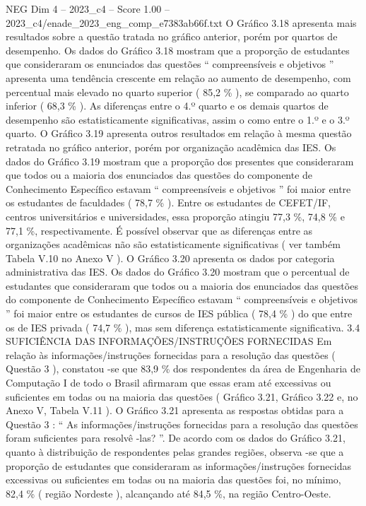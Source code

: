 \begin{textsample}{NEG Dim 4 – 2023\_c4 – Score 1.00 – 2023\_c4/enade\_2023\_eng\_comp\_e7383ab66f.txt}
O Gráfico 3.18 apresenta mais resultados sobre a questão tratada no gráfico anterior, porém por quartos de desempenho.
Os dados do Gráfico 3.18 mostram que a proporção de estudantes que consideraram os enunciados das questões “ compreensíveis e objetivos ” apresenta uma tendência crescente em relação ao aumento de desempenho, com percentual mais elevado no quarto superior ( 85,2 \% ), se comparado ao quarto inferior ( 68,3 \% ).
As diferenças entre o 4.º quarto e os demais quartos de desempenho são estatisticamente significativas, assim o como entre o 1.º e o 3.º quarto.
O Gráfico 3.19 apresenta outros resultados em relação à mesma questão retratada no gráfico anterior, porém por organização acadêmica das IES.
Os dados do Gráfico 3.19 mostram que a proporção dos presentes que consideraram que todos ou a maioria dos enunciados das questões do componente de Conhecimento Específico estavam “ compreensíveis e objetivos ” foi maior entre os estudantes de faculdades ( 78,7 \% ).
Entre os estudantes de CEFET/IF, centros universitários e universidades, essa proporção atingiu 77,3 \%, 74,8 \% e 77,1 \%, respectivamente.
É possível observar que as diferenças entre as organizações acadêmicas não são estatisticamente significativas ( ver também Tabela V.10 no Anexo V ).
O Gráfico 3.20 apresenta os dados por categoria administrativa das IES.
Os dados do Gráfico 3.20 mostram que o percentual de estudantes que consideraram que todos ou a maioria dos enunciados das questões do componente de Conhecimento Específico estavam “ compreensíveis e objetivos ” foi maior entre os estudantes de cursos de IES pública ( 78,4 \% ) do que entre os de IES privada ( 74,7 \% ), mas sem diferença estatisticamente significativa. 3.4 SUFICIÊNCIA DAS INFORMAÇÕES/INSTRUÇÕES FORNECIDAS Em relação às informações/instruções fornecidas para a resolução das questões ( Questão 3 ), constatou -se que 83,9 \% dos respondentes da área de Engenharia de Computação I de todo o Brasil afirmaram que essas eram até excessivas ou suficientes em todas ou na maioria das questões ( Gráfico 3.21, Gráfico 3.22 e, no Anexo V, Tabela V.11 ).
O Gráfico 3.21 apresenta as respostas obtidas para a Questão 3 : “ As informações/instruções fornecidas para a resolução das questões foram suficientes para resolvê -las? ”.
De acordo com os dados do Gráfico 3.21, quanto à distribuição de respondentes pelas grandes regiões, observa -se que a proporção de estudantes que consideraram as informações/instruções fornecidas excessivas ou suficientes em todas ou na maioria das questões foi, no mínimo, 82,4 \% ( região Nordeste ), alcançando até 84,5 \%, na região Centro-Oeste.

\end{textsample}
